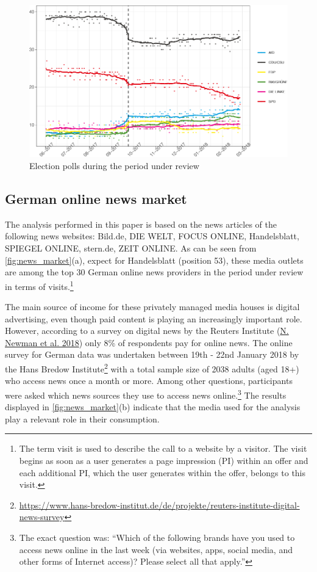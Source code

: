 \documentclass[
]{article}
\begin{document}
\begin{figure}

{\centering \includegraphics[width=0.5\linewidth]{main_text_files/figure-latex/election polls-1} 

}

\caption{Election polls during the period under review \label{fig:election_polls}}\label{fig:election polls}
\end{figure}

\hypertarget{german-online-news-market}{%
\subsection{German online news market}\label{german-online-news-market}}

The analysis performed in this paper is based on the news articles of
the following news websites: Bild.de, DIE WELT, FOCUS ONLINE,
Handelsblatt, SPIEGEL ONLINE, stern.de, ZEIT ONLINE. As can be seen from
\autoref{fig:news_market}(a), expect for Handelsblatt (position 53),
these media outlets are among the top 30 German online news providers in
the period under review in terms of visits.\footnote{The term visit is
  used to describe the call to a website by a visitor. The visit begins
  as soon as a user generates a page impression (PI) within an offer and
  each additional PI, which the user generates within the offer, belongs
  to this visit.}

The main source of income for these privately managed media houses is
digital advertising, even though paid content is playing an increasingly
important role. However, according to a survey on digital news by the
Reuters Institute (\protect\hyperlink{ref-newman_reuters_2018}{N. Newman
et al. 2018}) only 8\% of respondents pay for online news. The online
survey for German data was undertaken between 19th - 22nd January 2018
by the Hans Bredow Institute\footnote{\url{https://www.hans-bredow-institut.de/de/projekte/reuters-institute-digital-news-survey}}
with a total sample size of 2038 adults (aged 18+) who access news once
a month or more. Among other questions, participants were asked which
news sources they use to access news online.\footnote{The exact question
  was: ``Which of the following brands have you used to access news
  online in the last week (via websites, apps, social media, and other
  forms of Internet access)? Please select all that apply.''} The
results displayed in \autoref{fig:news_market}(b) indicate that the
media used for the analysis play a relevant role in their consumption.
\end{document}
